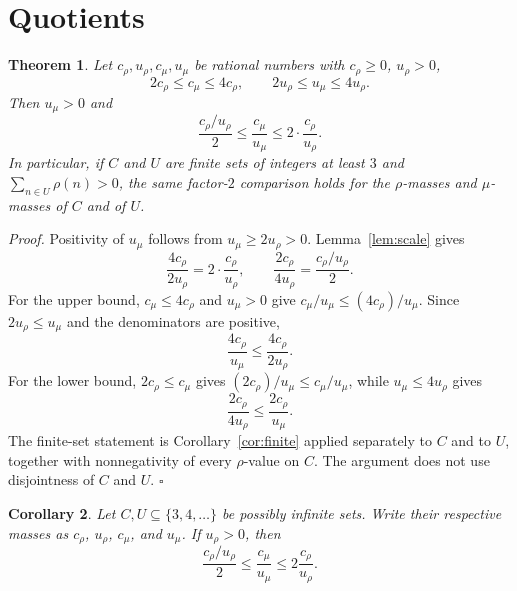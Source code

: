 \documentclass[11pt,letterpaper]{article}
\newtheorem{theorem}{Theorem}
\newtheorem{corollary}[theorem]{Corollary}
\newenvironment{proof}{\noindent\textit{Proof.}}{\hfill\(\square\)}
\begin{document}
\section{Quotients}

\begin{theorem}
\label{thm:quotient}
Let $c_{\rho},u_{\rho},c_{\mu},u_{\mu}$ be rational numbers with $c_{\rho}\ge 0$, $u_{\rho}>0$,
\begin{equation*}
2c_{\rho}\le c_{\mu}\le 4c_{\rho},
\qquad
2u_{\rho}\le u_{\mu}\le 4u_{\rho}.
\end{equation*}
Then $u_{\mu}>0$ and
\begin{equation*}
\frac{c_{\rho}/u_{\rho}}{2}
\le
\frac{c_{\mu}}{u_{\mu}}
\le
2\cdot\frac{c_{\rho}}{u_{\rho}}.
\end{equation*}
In particular, if $C$ and $U$ are finite sets of integers at least $3$ and $\sum_{n\in U}\rho(n)>0$, the same factor-$2$ comparison holds for the $\rho$-masses and $\mu$-masses of $C$ and of $U$.
\end{theorem}

\begin{proof}
Positivity of $u_{\mu}$ follows from $u_{\mu}\ge 2u_{\rho}>0$. Lemma~\ref{lem:scale} gives
\begin{equation*}
\frac{4c_{\rho}}{2u_{\rho}}=2\cdot\frac{c_{\rho}}{u_{\rho}},
\qquad
\frac{2c_{\rho}}{4u_{\rho}}=\frac{c_{\rho}/u_{\rho}}{2}.
\end{equation*}
For the upper bound, $c_{\mu}\le 4c_{\rho}$ and $u_{\mu}>0$ give
$c_{\mu}/u_{\mu}\le(4c_{\rho})/u_{\mu}$.
Since $2u_{\rho}\le u_{\mu}$ and the denominators are positive,
\[
\frac{4c_{\rho}}{u_{\mu}}
\le\frac{4c_{\rho}}{2u_{\rho}}.
\]
For the lower bound, $2c_{\rho}\le c_{\mu}$ gives
$(2c_{\rho})/u_{\mu}\le c_{\mu}/u_{\mu}$, while $u_{\mu}\le 4u_{\rho}$ gives
\[
\frac{2c_{\rho}}{4u_{\rho}}\le\frac{2c_{\rho}}{u_{\mu}}.
\]
The finite-set statement is Corollary~\ref{cor:finite} applied separately
to $C$ and to $U$, together with nonnegativity of every $\rho$-value on $C$.
The argument does not use disjointness of $C$ and $U$.
\end{proof}

\begin{corollary}
\label{cor:infinite-quotient}
Let $C,U\subseteq\{3,4,\ldots\}$ be possibly infinite sets.
Write their respective masses as $c_\rho$, $u_\rho$, $c_\mu$, and $u_\mu$.
If $u_\rho>0$, then
\begin{equation*}
\frac{c_\rho/u_\rho}{2}\le\frac{c_\mu}{u_\mu}
\le2\frac{c_\rho}{u_\rho}.
\end{equation*}
\end{corollary}
\end{document}

